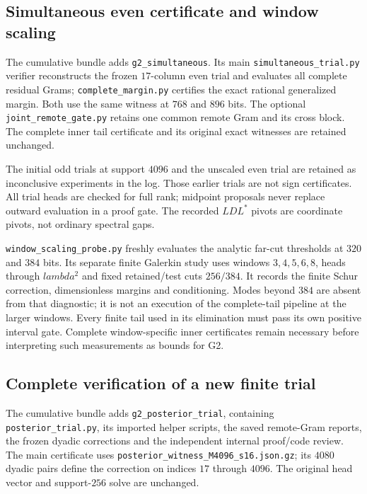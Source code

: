 \documentclass[11pt]{article}
\def\lambda{lambda}%
\theoremstyle{remark}
\begin{document}
\subsection{Simultaneous even certificate and window scaling}
\label{app:v125-simultaneous}
The cumulative bundle adds \texttt{g2\_simultaneous}. Its main
\texttt{simultaneous\_trial.py} verifier reconstructs the frozen
$17$-column even trial and evaluates all complete residual Grams;
\texttt{complete\_margin.py} certifies the exact rational generalized
margin. Both use the same witness at $768$ and $896$ bits.
The optional \texttt{joint\_remote\_gate.py} retains one common
remote Gram and its cross block. The complete inner tail certificate
and its original exact witnesses are retained unchanged.

The initial odd trials at support $4096$ and the unscaled even
trial are retained as inconclusive experiments in the log. Those
earlier trials are not sign certificates.
All trial heads are checked for full rank; midpoint proposals never
replace outward evaluation in a proof gate. The recorded $LDL^*$
pivots are coordinate pivots, not ordinary spectral gaps.

\texttt{window\_scaling\_probe.py} freshly evaluates the analytic
far-cut thresholds at $320$ and $384$ bits. Its separate finite
Galerkin study uses windows $3,4,5,6,8$, heads through $\lambda^2$
and fixed retained/test cuts $256/384$. It records the finite
Schur correction, dimensionless margins and conditioning. Modes
beyond $384$ are absent from that diagnostic; it is not an execution
of the complete-tail pipeline at the larger windows. Every finite
tail used in its elimination must pass its own positive interval
gate. Complete window-specific inner certificates remain necessary
before interpreting such measurements as bounds for G2.

\subsection{Complete verification of a new finite trial}
\label{app:v124-posterior}
The cumulative bundle adds \texttt{g2\_posterior\_trial}, containing
\nolinkurl{posterior_trial.py}, its imported helper scripts, the
saved remote-Gram reports, the frozen dyadic corrections and the
independent internal proof/code review. The main certificate uses
\nolinkurl{posterior_witness_M4096_s16.json.gz}; its $4080$ dyadic
pairs define the correction on indices $17$ through $4096$.
The original head vector and support-$256$ solve are unchanged.
\end{document}
